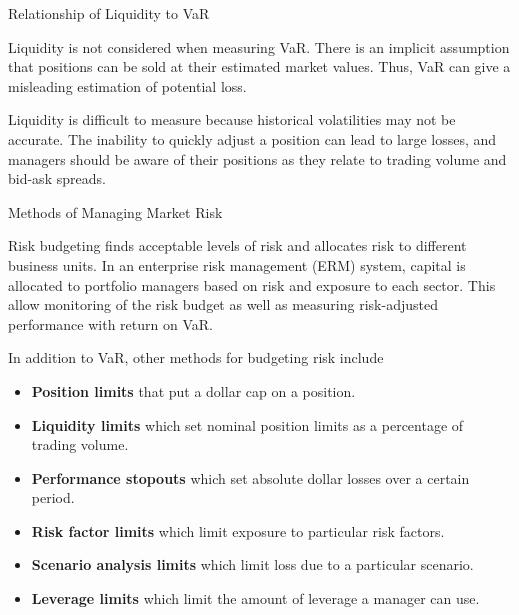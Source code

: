 \documentclass[../custom,grid]{flashcards}
\newcommand{\studyArea}{Risk Management}
\begin{document}
\begin{flashcard}[\studyArea]{Relationship of Liquidity to VaR}
    \begin{flushleft}
        Liquidity is not considered when measuring VaR. There is an implicit assumption that positions can be sold at their estimated market values. Thus, VaR can give a misleading estimation of potential loss.\newline

        Liquidity is difficult to measure because historical volatilities may not be accurate. The inability to quickly adjust a position can lead to large losses, and managers should be aware of their positions as they relate to trading volume and bid-ask spreads.
    \end{flushleft}
\end{flashcard}

\begin{flashcard}[\studyArea]{Methods of Managing Market Risk}
    \begin{flushleft}
        Risk budgeting finds acceptable levels of risk and allocates risk to different business units. In an enterprise risk management (ERM) system, capital is allocated to portfolio managers based on risk and exposure to each sector. This allow monitoring of the risk budget as well as measuring risk-adjusted performance with return on VaR.\newline

        In addition to VaR, other methods for budgeting risk include
        \begin{itemize}
            \item \textbf{Position limits} that put a dollar cap on a position.
            \item \textbf{Liquidity limits} which set nominal position limits as a percentage of trading volume.
            \item \textbf{Performance stopouts} which set absolute dollar losses over a certain period.
            \item \textbf{Risk factor limits} which limit exposure to particular risk factors.
            \item \textbf{Scenario analysis limits} which limit loss due to a particular scenario.
            \item \textbf{Leverage limits} which limit the amount of leverage a manager can use.
        \end{itemize}
    \end{flushleft}
\end{flashcard}
\end{document}

